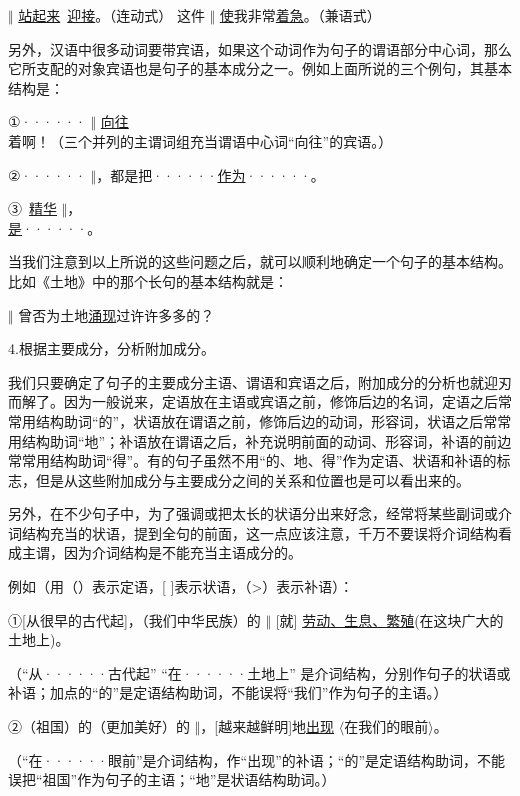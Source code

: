  $\Vert$ \uline{站起来}\ \uline{迎接}。（连动式）
这件 $\Vert$ \uline{使}我非常\uline{着急}。（兼语式）

另外，汉语中很多动词要带宾语，如果这个动词作为句子的谓语部分中心词，那么它所支配的对象宾语也是句子的基本成分之一。例如上面所说的三个例句，其基本结构是：

①······ $\Vert$ \uline{向往}着啊！（三个并列的主谓词组充当谓语中心词“向往”的宾语。）

②······ $\Vert$，都是把······\uline{作为}······。

③\ \uline{精华} $\Vert$，\\
\uline{是}······。

\newpage

当我们注意到以上所说的这些问题之后，就可以顺利地确定一个句子的基本结构。比如《土地》中的那个长句的基本结构就是：

 $\Vert$ 曾否为土地\uline{涌现}过许许多多的？

4.根据主要成分，分析附加成分。

我们只要确定了句子的主要成分主语、谓语和宾语之后，附加成分的分析也就迎刃而解了。因为一般说来，定语放在主语或宾语之前，修饰后边的名词，定语之后常常用结构助词“的”，状语放在谓语之前，修饰后边的动词，形容词，状语之后常常用结构助词“地”；补语放在谓语之后，补充说明前面的动词、形容词，补语的前边常常用结构助词“得”。有的句子虽然不用“的、地、得”作为定语、状语和补语的标志，但是从这些附加成分与主要成分之间的关系和位置也是可以看出来的。

另外，在不少句子中，为了强调或把太长的状语分出来好念，经常将某些副词或介词结构充当的状语，提到全句的前面，这一点应该注意，千万不要误将介词结构看成主谓，因为介词结构是不能充当主语成分的。

例如（用（）表示定语，[ ]表示状语，（>）表示补语）：

①[从很早的古代起]，（我们中华民族）的 $\Vert$ [就]
\uline{劳动、生息、繁殖}(在这块广大的土地上)。

（“从······古代起”
“在······土地上”
是介词结构，分别作句子的状语或补语；加点的“的”是定语结构助词，不能误将“我们”作为句子的主语。）

②（祖国）的（更加美好）的 $\Vert$，[越来越鲜明]地\uline{出现} $\langle$在我们的眼前$\rangle$。

（“在······眼前”是介词结构，作“出现”的补语；“的”是定语结构助词，不能误把“祖国”作为句子的主语；“地”是状语结构助词。）

